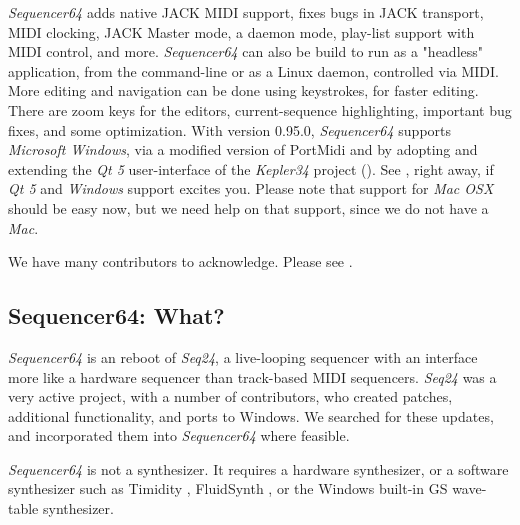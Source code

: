 \documentclass[
 11pt,
 twoside,
 a4paper,
 headinclude,
 footinclude,
 final                                 %
]{article}
\begin{document}
   \textsl{Sequencer64} adds native JACK MIDI support,
   fixes bugs in JACK transport, MIDI clocking,
   JACK Master mode,
   a daemon mode, play-list support with MIDI control,
   and more.
   \textsl{Sequencer64} can also be build to run as a "headless" application,
   from the command-line or as a Linux daemon, controlled via MIDI.
   More editing and navigation can be done using keystrokes,
   for faster editing.
   There are zoom keys for the editors, current-sequence highlighting,
   important bug fixes, and some optimization.
   With version 0.95.0, \textsl{Sequencer64} supports
   \textsl{Microsoft Windows}, via 
   a modified version of PortMidi and by
   adopting and extending the \textsl{Qt 5} user-interface of the
   \textsl{Kepler34} project (\cite{kepler34}).
   See , right away, if \textsl{Qt 5} and
   \textsl{Windows} support excites you.
   Please note that support for \textsl{Mac OSX} should be easy now,
   but we need help on that support, since we do not have a \textsl{Mac}.

   We have many contributors to acknowledge.  Please see
   .

\subsection{Sequencer64: What?}
\label{subsec:what_is_sequencer64}

   \textsl{Sequencer64} is an reboot of \textsl{Seq24},
   a live-looping sequencer with an interface more like a hardware sequencer
   than track-based MIDI sequencers.
   \textsl{Seq24} was a very active project, with a
   number of contributors, who created patches, additional
   functionality, and ports to Windows.
   We searched for these updates, and
   incorporated them into \textsl{Sequencer64} where feasible.

   \textsl{Sequencer64} is not a synthesizer.  It requires a hardware
   synthesizer, or a software synthesizer such as Timidity \cite{timidity},
   FluidSynth \cite{fluidsynth}, or
   the Windows built-in GS wave-table synthesizer.
\end{document}
